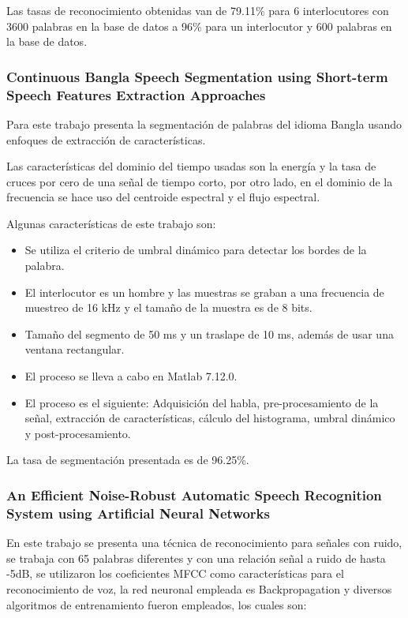 	Las tasas de reconocimiento obtenidas van de 79.11\% para 6 interlocutores con 3600 palabras en la base de datos a 96\% para un interlocutor y 600 palabras en la base de datos.
	
	\subsubsection*{Continuous Bangla Speech Segmentation using Short-term Speech Features Extraction Approaches \cite{A31}}\label{sub:sota:A31}
	
	Para este trabajo presenta la segmentación de palabras del idioma Bangla usando enfoques de extracción de características.
	
	Las características del dominio del tiempo usadas son la energía y la tasa de cruces por cero de una señal de tiempo corto, por otro lado, en el dominio de la frecuencia se hace uso del centroide espectral y el flujo espectral.
	
	Algunas características de este trabajo son:
	
	\begin{itemize}
	\item	Se utiliza el criterio de umbral dinámico para detectar los bordes de la palabra.
	\item	El interlocutor es un hombre y las muestras se graban a una frecuencia de muestreo de 16 kHz y el tamaño de la muestra es de 8 bits.
	\item	Tamaño del segmento de 50 ms y un traslape de 10 ms, además de usar una ventana rectangular.
	\item	El proceso se lleva a cabo en Matlab 7.12.0.
	\item	El proceso es el siguiente: Adquisición del habla, pre-procesamiento de la señal, extracción de características, cálculo del histograma, umbral dinámico y post-procesamiento.
	\end{itemize}
	
	La tasa de segmentación presentada es de 96.25\%.
	
	\subsubsection*{An Efficient Noise-Robust Automatic Speech Recognition System using Artificial Neural Networks \cite{A3}}\label{sub:sota:A3}
	
	En este trabajo se presenta una técnica de reconocimiento para señales con ruido, se trabaja con 65 palabras diferentes y con una relación señal a ruido de hasta -5dB, se utilizaron los coeficientes MFCC como características para el reconocimiento de voz, la red neuronal empleada es Backpropagation y diversos algoritmos de entrenamiento fueron empleados, los cuales son:
	
